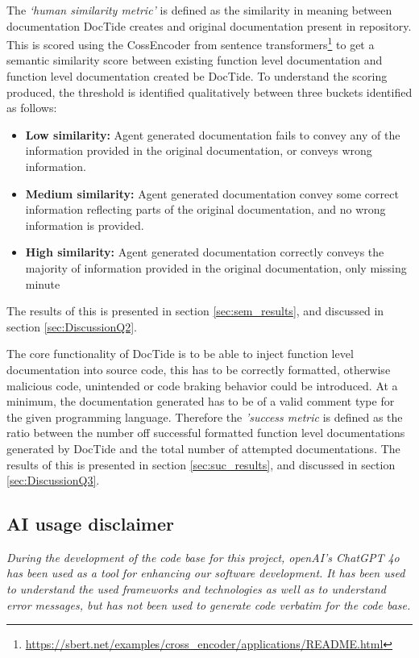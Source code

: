 The \textit{`human similarity metric'} is defined as the similarity in meaning between documentation DocTide creates and original documentation present in repository. This is scored using the CossEncoder from sentence transformers\footnote{\url{https://sbert.net/examples/cross_encoder/applications/README.html}} to get a semantic similarity score between existing function level documentation and function level documentation created be DocTide. To understand the scoring produced, the threshold is identified qualitatively between three buckets identified as follows:
\begin{itemize}
    \item \textbf{Low similarity:} Agent generated documentation fails to convey any of the information provided in the original documentation, or conveys wrong information.
    \item \textbf{Medium similarity:} Agent generated documentation convey some correct information reflecting parts of the original documentation, and no wrong information is provided.
    \item \textbf{High similarity:} Agent generated documentation correctly conveys the majority of information provided in the original documentation, only missing minute 
\end{itemize}
The results of this is presented in section \ref{sec:sem_results}, and discussed in section \ref{sec:DiscussionQ2}.

The core functionality of DocTide is to be able to inject function level documentation into source code, this has to be correctly formatted, otherwise malicious code, unintended or code braking behavior could be introduced. At a minimum, the documentation generated has to be of a valid comment type for the given programming language. Therefore the \textit{'success metric} is defined as the ratio between the number off successful formatted function level documentations generated by DocTide and the total number of attempted documentations. The results of this is presented in section \ref{sec:suc_results}, and discussed in section \ref{sec:DiscussionQ3}.

\subsection{AI usage disclaimer}
\textit{During the development of the code base for this project, openAI's ChatGPT 4o has been used as a tool for enhancing our software development. It has been used to understand the used frameworks and technologies as well as to understand error messages, but has not been used to generate code verbatim for the code base.
}